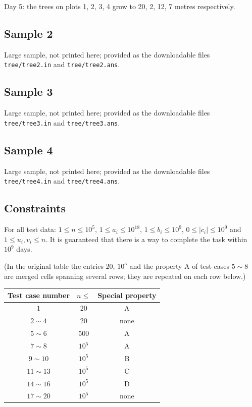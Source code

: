 \documentclass[11pt]{article}
\begin{document}
Day 5: the trees on plots 1, 2, 3, 4 grow to 20, 2, 12, 7 metres
respectively.

\subsection*{Sample 2}

Large sample, not printed here;
provided as the downloadable files \texttt{tree/tree2.in} and \texttt{tree/tree2.ans}.

\subsection*{Sample 3}

Large sample, not printed here;
provided as the downloadable files \texttt{tree/tree3.in} and \texttt{tree/tree3.ans}.

\subsection*{Sample 4}

Large sample, not printed here;
provided as the downloadable files \texttt{tree/tree4.in} and \texttt{tree/tree4.ans}.

\subsection*{Constraints}

For all test data: $1 \le n \le 10^5$, $1 \le a_i \le 10^{18}$,
$1 \le b_i \le 10^9$, $0 \le |c_i| \le 10^9$ and $1 \le u_i, v_i \le n$.
It is guaranteed that there is a way to complete the task within $10^9$
days.

(In the original table the entries $20$, $10^5$ and the property A of
test cases $5 \sim 8$ are merged cells spanning several rows; they are
repeated on each row below.)

\begin{center}
\begin{tabular}{ccc}
\toprule
Test case number & $n \le$ & Special property \\
\midrule
$1$ & 20 & A \\
$2 \sim 4$ & 20 & none \\
$5 \sim 6$ & 500 & A \\
$7 \sim 8$ & $10^5$ & A \\
$9 \sim 10$ & $10^5$ & B \\
$11 \sim 13$ & $10^5$ & C \\
$14 \sim 16$ & $10^5$ & D \\
$17 \sim 20$ & $10^5$ & none \\
\bottomrule
\end{tabular}
\end{center}
\end{document}
